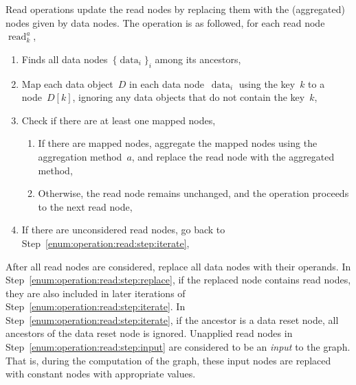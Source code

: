 \documentclass{article}
\DeclareMathOperator{\readNode}{read}
\DeclareMathOperator{\dataNode}{data}
\begin{document}
Read operations update the read nodes by replacing them with the (aggregated) nodes given by data nodes.
The operation is as followed, for each read node~$\readNode_k^a$,
\begin{enumerate}
	\item\label{enum:operation:read:step:iterate} Finds all data nodes~$\{\dataNode_i\}_i$ among its ancestors,
	\item Map each data object~$D$ in each data node~$\dataNode_i$ using the key~$k$ to a node~$D[k]$, ignoring any data objects that do not contain the key~$k$,
	\item Check if there are at least one mapped nodes,
	      \begin{enumerate}
		      \item\label{enum:operation:read:step:replace} If there are mapped nodes, aggregate the mapped nodes using the aggregation method~$a$, and replace the read node with the aggregated method,
		      \item\label{enum:operation:read:step:input} Otherwise, the read node remains unchanged, and the operation proceeds to the next read node,
	      \end{enumerate}
	\item If there are unconsidered read nodes, go back to Step~\ref{enum:operation:read:step:iterate},
\end{enumerate}
%
After all read nodes are considered, replace all data nodes with their operands.
In Step~\ref{enum:operation:read:step:replace}, if the replaced node contains read nodes, they are also included in later iterations of Step~\ref{enum:operation:read:step:iterate}.
In Step~\ref{enum:operation:read:step:iterate}, if the ancestor is a data reset node, all ancestors of the data reset node is ignored.
Unapplied read nodes in Step~\ref{enum:operation:read:step:input} are considered to be an \emph{input} to the graph.
That is, during the computation of the graph, these input nodes are replaced with constant nodes with appropriate values.
\end{document}
